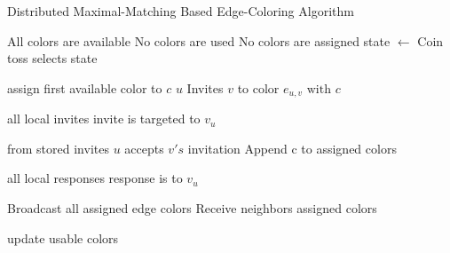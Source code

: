 \begin{algorithm}
\caption{Distributed Maximal-Matching Based Edge-Coloring Algorithm}
\begin{algorithmic}[1]
 \Comment All colors are available \label{alglin:ec-init-color}
 \Comment No colors are used \label{alglin:ec-init-dict}
 \Comment No colors are assigned
\State state $\leftarrow$ \cCd
\Repeat
{}
 \Comment Coin toss selects state

\label{alglin:ec-issue-invite}
 \Comment assign first available color to $c$
 \Comment $u$ Invites $v$ to color $e_{u,v} \text{ with } c$ 

 \Comment all local invites
 \Comment invite is targeted to $v_u$
\EndIf
{}

 \Comment from stored invites \label{alglin:ec-choose-invite}
 \Comment $u$ accepts $v's$ invitation
 \Comment Append c to assigned colors

 \Comment all local responses
 \Comment response is to $v_u$
\EndIf

 \Comment Broadcast all assigned edge colors
 \Comment Receive neighbors assigned colors

 \Comment update usable colors
\EndIf
{}\label{alglin:ec-end-while}
\EndFor
\end{algorithmic}
\label{alg:edge-color}
\end{algorithm}

